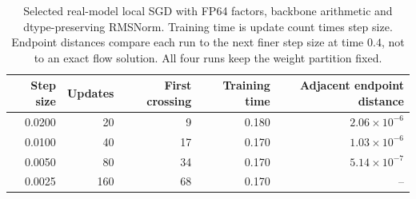 \begin{table}[t]
\centering\small
\begin{tabular}{rrrrr}
\toprule
Step size & Updates & First crossing & Training time & Adjacent endpoint distance \\
\midrule
0.0200 & 20 & 9 & 0.180 & $2.06\times10^{-6}$ \\
0.0100 & 40 & 17 & 0.170 & $1.03\times10^{-6}$ \\
0.0050 & 80 & 34 & 0.170 & $5.14\times10^{-7}$ \\
0.0025 & 160 & 68 & 0.170 & -- \\
\bottomrule\end{tabular}
\caption{Selected real-model local SGD with FP64 factors, backbone arithmetic and dtype-preserving RMSNorm. Training time is update count times step size. Endpoint distances compare each run to the next finer step size at time $0.4$, not to an exact flow solution. All four runs keep the weight partition fixed.}
\label{tab:local-flow-refinement}
\end{table}

